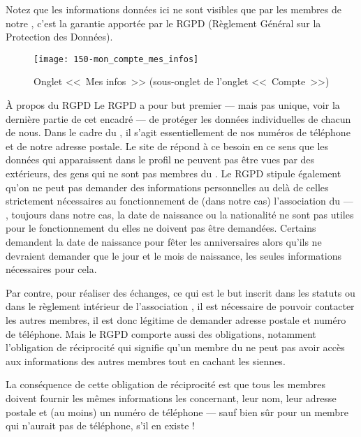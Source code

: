 Notez que les informations données ici ne sont visibles que par les membres de notre \sel, c’est la garantie apportée par le RGPD (Règlement Général sur la Protection des Données).
\begin{figure}
    \texttt{[image: 150-mon\_compte\_mes\_infos]}
    \caption[Onglet <<~Mes infos~>>]{Onglet <<~Mes infos~>> (sous-onglet de l'onglet <<~Compte~>>)}
    \label{fig:mesInfos}
\end{figure}
\begin{mybox}[colbacktitle=MidnightBlue]{À propos du RGPD}
    Le RGPD a pour but premier --- mais pas unique, voir la dernière partie de cet encadré --- de protéger les données individuelles de chacun de nous. Dans le cadre du \sel{}, il s'agit essentiellement de nos numéros de téléphone et de notre adresse postale. Le site de \CF{} répond à ce besoin en ce sens que les données qui apparaissent dans le profil ne peuvent pas être vues par des extérieurs, \cad{} des gens qui ne sont pas membres du \CdS.
    \aster
    Le RGPD stipule également qu'on ne peut pas demander des informations personnelles au delà de celles strictement nécessaires au fonctionnement de (dans notre cas) l'association du \sel{} --- \ex, toujours dans notre cas, la date de naissance ou la nationalité ne sont pas utiles pour le fonctionnement du \sel{} elles ne doivent pas être demandées. Certains \sel{} demandent la date de naissance pour fêter les anniversaires alors  qu'ils ne devraient demander que le jour et le mois de naissance, les seules informations nécessaires pour cela.
    
    Par contre, pour réaliser des échanges, ce qui est le but inscrit dans les statuts ou dans le règlement intérieur de l'association \CdS, il est nécessaire de pouvoir contacter les autres membres, il est donc légitime de demander adresse postale et numéro de téléphone.
    \aster
    Mais le RGPD comporte aussi des obligations, notamment l'obligation de réciprocité qui signifie qu'un membre du \sel{} ne peut pas avoir accès aux informations des autres membres tout en cachant les siennes. 
    
    La conséquence de cette obligation de réciprocité est que tous les membres doivent fournir les mêmes informations les concernant, \cad{} leur nom, leur adresse postale et (au moins) un numéro de téléphone --- sauf bien sûr pour un membre qui n'aurait pas de téléphone, s'il en existe !
\end{mybox}

\medskip

